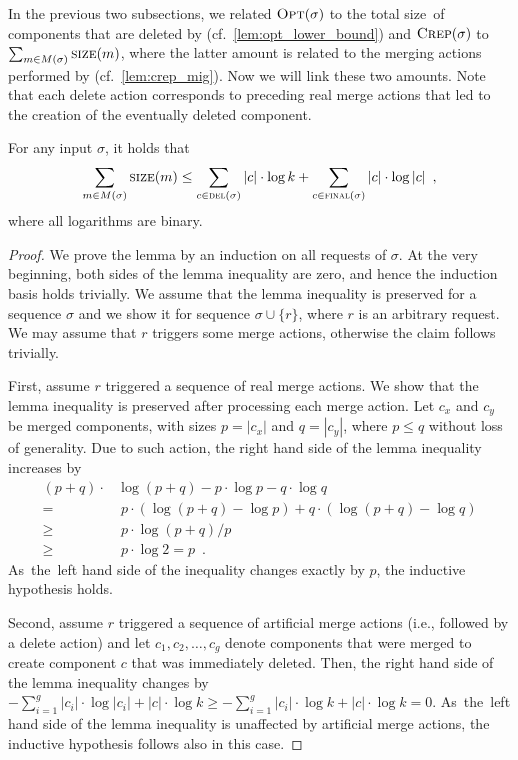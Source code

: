 In the previous two subsections, we related $\textsc{Opt}(\sigma)$ to the total
size~of components that are deleted by \CREP
(cf.~\ref{lem:opt_lower_bound}) and $\textsc{Crep}(\sigma)$ to $\sum_{m \in
M(\sigma)} \textsc{size}(m)$, where the latter amount is related to the merging
actions performed by \CREP (cf.~\ref{lem:crep_mig}). Now we will link
these two amounts. Note that each delete action corresponds to preceding real
merge actions that led to the creation of the eventually deleted component.

\begin{lemma}
\label{lem:bounding_merges}
For any input $\sigma$, it holds that 
$$\sum_{m \in M(\sigma)} \textsc{size}(m) 
	\leq \sum_{c \in \textsc{del}(\sigma)} |c| \cdot \log k +
	\sum_{c \in \textsc{final}(\sigma)} |c| \cdot \log |c|\enspace,$$
where all logarithms are binary.
\end{lemma}

\begin{proof}
We prove the lemma by an induction on all requests of $\sigma$. At the very beginning, both sides of the lemma
inequality are zero, and hence the induction basis holds trivially. 
We assume that the lemma inequality is preserved for a sequence $\sigma$ and we show it for 
sequence $\sigma \cup \{ r \}$, where $r$ is an arbitrary request. We may assume that $r$ 
triggers some merge actions, otherwise the claim follows trivially.

First, assume $r$ triggered a sequence of real merge actions. We show that the
lemma inequality is preserved after processing each merge action. Let $c_x$
and $c_y$ be merged components, with sizes $p = |c_x|$ and $q = |c_y|$, where
$p \leq q$ without loss of generality. Due to such action, the right hand side
of the lemma inequality increases by
\begin{align*}
  (p + q) \cdot & \log (p + q) - p \cdot \log p - q \cdot \log q \\
		= &\; p \cdot (\log (p+q) - \log p) + q \cdot (\log (p+q) - \log q) \\
		\geq &\; p \cdot \log (p+q) / p \\
		\geq &\; p \cdot \log 2 = p \enspace.
\end{align*}
As~the~left hand side of the inequality changes exactly by $p$, the inductive
hypothesis holds.

Second, assume $r$ triggered a sequence of artificial merge actions (i.e., followed by a
delete action) and let $c_1, c_2, \ldots, c_g$ denote components that were
merged to create component $c$ that was immediately deleted. Then, the right
hand side of the lemma inequality changes by $- \sum_{i = 1}^g |c_i| \cdot
\log |c_i| + |c| \cdot \log k
\geq - \sum_{i = 1}^g |c_i| \cdot \log k + |c| \cdot \log k = 0$.
As~the~left hand side of the lemma inequality is unaffected by artificial
merge actions, the inductive hypothesis follows also in this case.
\end{proof}



